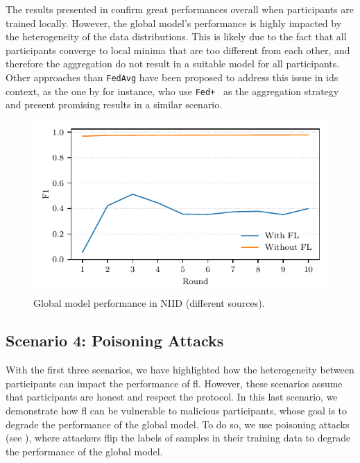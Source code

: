 The results presented in  confirm great performances overall when participants are trained locally. 
However, the global model's performance is highly impacted by the heterogeneity of the data distributions.
This is likely due to the fact that all participants converge to local minima that are too different from each other, and therefore the aggregation do not result in a suitable model for all participants.
Other approaches than \texttt{FedAvg} have been proposed to address this issue in \gls{ids} context, as the one by \textcite{popoola_FederatedDeepLearning_2021} for instance, who use \texttt{Fed+}~\cite{kundu_RobustnessPersonalizationFederated_2022a} as the aggregation strategy and present promising results in a similar scenario.

\begin{figure}
    \centering
    \includegraphics{figures/heterogeneous.pdf}
    \caption{Global model performance in NIID (different sources).}
    \label{fig:heterogeneous}
\end{figure}


\subsection{Scenario 4: Poisoning Attacks\label{sec:app.demo.poisoning}}

With the first three scenarios, we have highlighted how the heterogeneity between participants can impact the performance of \gls{fl}.
However, these scenarios assume that participants are honest and respect the protocol.
In this last scenario, we demonstrate how \gls{fl} can be vulnerable to malicious participants, whose goal is to degrade the performance of the global model.
To do so, we use poisoning attacks (see ), where attackers flip the labels of  samples in their training data to degrade the performance of the global model.

